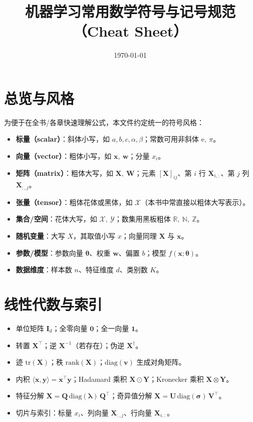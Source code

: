 \documentclass[UTF8,zihao=-4]{ctexart}
\title{机器学习常用数学符号与记号规范（Cheat Sheet）}
\author{}
\date{\today}
\newcommand{\R}{\mathbb{R}}
\newcommand{\N}{\mathbb{N}}
\newcommand{\Z}{\mathbb{Z}}
\newcommand{\tr}{\mathrm{tr}}
\newcommand{\rank}{\mathrm{rank}}
\newcommand{\diag}{\mathrm{diag}}
\newcommand{\1}{\mathbf{1}}
\newcommand{\0}{\mathbf{0}}
\begin{document}
\maketitle
\tableofcontents

\section{总览与风格}
为便于在全书/各章快速理解公式，本文件约定统一的符号风格：
\begin{itemize}
  \item \textbf{标量（scalar）}：斜体小写，如 $a, b, c, \alpha, \beta$；常数可用非斜体 $\mathrm{e},\ \pi$。
  \item \textbf{向量（vector）}：粗体小写，如 $\bm{x},\ \bm{w}$；分量 $x_i$。
  \item \textbf{矩阵（matrix）}：粗体大写，如 $\bm{X},\ \bm{W}$；元素 $[\bm{X}]_{ij}$、第 $i$ 行 $\bm{X}_{i,:}$、第 $j$ 列 $\bm{X}_{:,j}$。
  \item \textbf{张量（tensor）}：粗体花体或黑体，如 $\bm{\mathcal{X}}$（本书中常直接以粗体大写表示）。
  \item \textbf{集合/空间}：花体大写，如 $\mathcal{X},\ \mathcal{Y}$；数集用黑板粗体 $\R,\ \N,\ \Z$。
  \item \textbf{随机变量}：大写 $X$，其取值小写 $x$；向量同理 $\bm{X}$ 与 $\bm{x}$。
  \item \textbf{参数/模型}：参数向量 $\bm{\theta}$、权重 $\bm{w}$、偏置 $b$；模型 $f(\bm{x};\bm{\theta})$。
  \item \textbf{数据维度}：样本数 $n$、特征维度 $d$、类别数 $K$。
\end{itemize}

\section{线性代数与索引}
\begin{itemize}
  \item 单位矩阵 $\bm{I}_d$；全零向量 $\0$；全一向量 $\1$。
  \item 转置 $\bm{X}^\top$；逆 $\bm{X}^{-1}$（若存在）；伪逆 $\bm{X}^{\dagger}$。
  \item 迹 $\tr(\bm{X})$；秩 $\rank(\bm{X})$；\(\diag(\bm{v})\) 生成对角矩阵。
  \item 内积 $\langle \bm{x},\bm{y} \rangle = \bm{x}^\top\bm{y}$；Hadamard 乘积 $\bm{X}\odot\bm{Y}$；Kronecker 乘积 $\bm{X}\otimes\bm{Y}$。
  \item 特征分解 $\bm{X}=\bm{Q}\,\diag(\bm{\lambda})\,\bm{Q}^\top$；奇异值分解 $\bm{X}=\bm{U}\,\diag(\bm{\sigma})\,\bm{V}^\top$。
  \item 切片与索引：标量 $x_i$、列向量 $\bm{X}_{:,j}$、行向量 $\bm{X}_{i,:}$。
\end{itemize}
\end{document}
